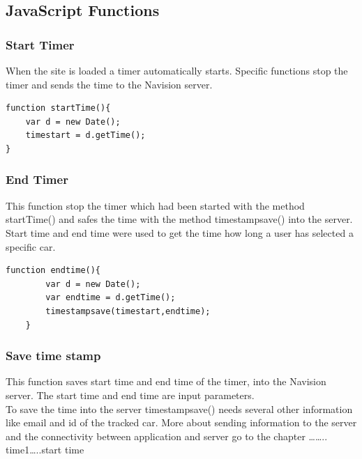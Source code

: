 \subsection{JavaScript Functions}



\subsubsection{Start Timer}
When the site is loaded a timer automatically starts. Specific functions stop the timer and sends the time to the Navision server.
\\
\begin{lstlisting}[language=html, caption= 
start timer function,captionpos=b]
function startTime(){
	var d = new Date();
	timestart = d.getTime();
}
\end{lstlisting}

\subsubsection{End Timer}
This function stop the timer which had been started with the method startTime() and safes the time with the method timestampsave() into the server. Start time and end time were used to get the time how long a user has selected a specific car.
\\
\begin{lstlisting}[language=html, caption= 
start timer function,captionpos=b]
function endtime(){
        var d = new Date();
        var endtime = d.getTime();
        timestampsave(timestart,endtime);
    }
\end{lstlisting}


\subsubsection{Save time stamp}
This function saves start time and end time of the timer, into the Navision server. The start time and end time are input parameters. 
\\

To save the time into the server timestampsave() needs several other information like email and id of the tracked car. More about sending information to the server and the connectivity between application and server go to the chapter …….. 
\\

time1…..start time

